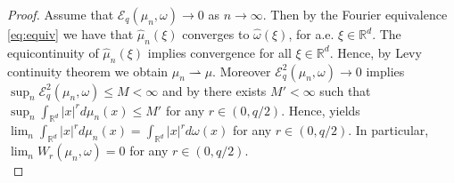 \documentclass[12pt,a4paper,oneside]{amsart}
\theoremstyle{plain}
\theoremstyle{definition}
\numberwithin{equation}{section}
\numberwithin{figure}{section}
\numberwithin{table}{section}
\theoremstyle{remark}
\newcommand{\R}{\mathbb{R}}
\begin{document}
\begin{proof}
    Assume that $\mathcal E_q(\mu_n,\omega) \to 0$ as $n\to \infty$. Then by the Fourier equivalence \eqref{eq:equiv} we have that $\hat \mu_n(\xi)$ converges to $\hat \omega(\xi)$, for a.e. $\xi \in \mathbb R^d$. The equicontinuity of $\hat \mu_n(\xi)$ implies convergence for all $\xi \in \mathbb R^d$. Hence, by Levy continuity theorem \cite[Theorems 14.15 and 18.21]{fristedt1997} we obtain $\mu_n \rightharpoonup \mu$. Moreover  $\mathcal E_q^2(\mu_n,\omega) \to 0$ implies $\sup_n \mathcal E_q^2(\mu_n,\omega) \leq  M < \infty$ and by \cite[Theorem 4.1]{fornasier2014consistency} there exists $M'<\infty$ such that $\sup_n \int_{\R^d} |x|^r d\mu_n(x) \leq M'$ for any $r \in (0,q/2)$. Hence,  \cite[Lemma 5.1.7]{ambrosio2008gradient} yields $\lim_n \int_{\R^d} |x|^r d\mu_n(x)= \int_{\R^d} |x|^r d\omega(x)$ for any $r \in (0,q/2)$. In particular,  $\lim_n W_r(\mu_n,\omega)=0$ for any $r \in (0,q/2)$.\\
    

\end{proof}
\end{document}
